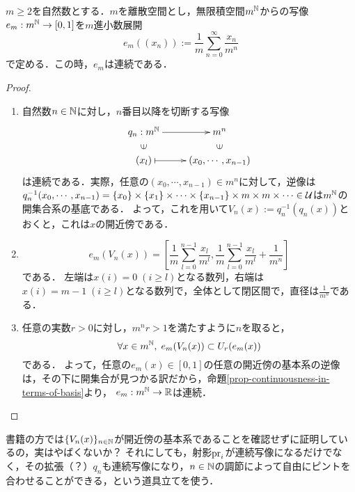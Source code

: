 \documentclass[uplatex, dvipdfmx]{jsreport}
\begin{document}
\begin{lemma}[$m$進小数展開は連続]
    $m\ge 2$を自然数とする．$m$を離散空間とし，無限積空間$m^{\mathbb{N}}$からの写像$e_m:m^{\mathbb{N}}\to[0,1]$を$m$進小数展開
    \[ e_m((x_n)):=\frac{1}{m}\sum^\infty_{n=0}\frac{x_n}{m^n} \]
    で定める．この時，$e_m$は連続である．
\end{lemma}
\begin{proof}\mbox{}
    \begin{enumerate}
        \item 自然数$n\in\mathbb{N}$に対し，$n$番目以降を切断する写像\[\xymatrix@R-2pc{
            q_n:m^\N\ar[r]&m^n\\
            \rotatebox[origin=c]{90}{$\in$}&\rotatebox[origin=c]{90}{$\in$}\\
            (x_l)\ar@{|->}[r]&(x_0,\cdots,x_{n-1})
        }\]
        は連続である．実際，任意の$(x_0,\cdots,x_{n-1})\in m^n$に対して，逆像は$q_n^{-1}(x_0,\cdots,x_{n-1})=\{x_0\}\times\{x_1\}\times\cdots\times\{x_{n-1}\}\times m\times m\times\cdots\in\mathcal{U}$は$m^{\mathbb{N}}$の開集合系の基底である．
        よって，これを用いて$V_n(x):=q_n^{-1}(q_n(x))$とおくと，これは$x$の開近傍である．
        \item \[e_m(V_n(x))=\left[\frac{1}{m}\sum^{n-1}_{l=0}\frac{x_l}{m^l},\frac{1}{m}\sum^{n-1}_{l=0}\frac{x_l}{m^l}+\frac{1}{m^n}\right]\]である．
        左端は$x(i)=0\;(i\ge l)$となる数列，右端は$x(i)=m-1\;(i\ge l)$となる数列で，全体として閉区間で，直径は$\frac{1}{m^n}$である．
        \item 任意の実数$r>0$に対し，$m^nr>1$を満たすように$n$を取ると，\[\forall x\in m^{\mathbb{N}},\;e_m(V_n(x))\subset U_r(e_m(x))\]である．
        よって，任意の$e_m(x)\in[0,1]$の任意の開近傍の基本系の逆像は，その下に開集合が見つかる訳だから，命題\ref{prop-continuousness-in-terms-of-basis}より，
        $e_m:m^{\mathbb{N}}\to\mathbb{R}$は連続．
    \end{enumerate}
\end{proof}
\begin{remarks}
    書籍の方では$\{V_n(x)\}_{n\in\mathbb{N}}$が開近傍の基本系であることを確認せずに証明しているの，実はやばくないか？
    それにしても，射影$\mathrm{pr}_i$が連続写像になるだけでなく，その拡張（？）$q_n$も連続写像になり，$n\in\mathbb{N}$の調節によって自由にピントを合わせることができる，という道具立てを使う．
\end{remarks}
\end{document}
